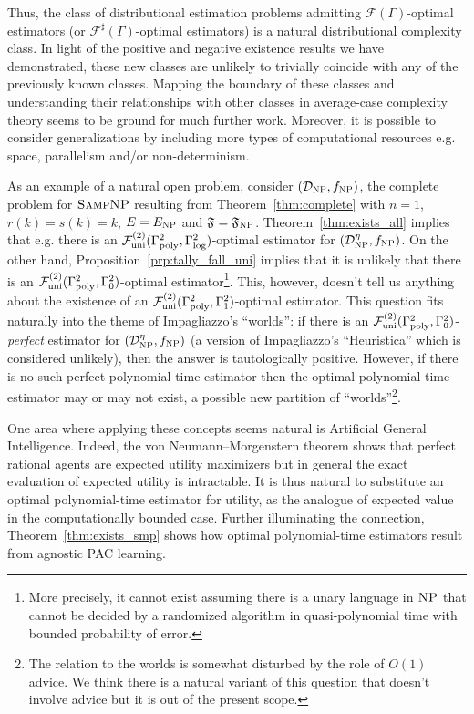 \documentclass[11pt]{article}
\numberwithin{equation}{section}
\theoremstyle{definition}
\theoremstyle{plain}
\newcommand{\Dist}{\mathcal{D}}
\newcommand{\Fall}{\mathcal{F}}
\newcommand{\EG}{\Fall(\Gamma)}
\newcommand{\ESG}{\Fall^\sharp(\Gamma)}
\newcommand{\GammaPoly}{\Gamma_{\textnormal{poly}}}
\newcommand{\GammaLog}{\Gamma_{\textnormal{log}}}
\begin{document}
Thus, the class of distributional estimation problems admitting ${\EG}$-optimal estimators (or ${\ESG}$-optimal estimators) is a natural distributional complexity class. In light of the positive and negative existence results we have demonstrated, these new classes are unlikely to trivially coincide with any of the previously known classes. Mapping the boundary of these classes and understanding their relationships with other classes in average-case complexity theory seems to be ground for much further work. Moreover, it is possible to consider generalizations by including more types of computational resources e.g. space, parallelism and/or non-determinism.

As an example of a natural open problem, consider ${(\Dist_{\textsc{NP}}, f_{\textsc{NP}})}$, the complete problem for ${\textsc{SampNP}}$ resulting from Theorem~\ref{thm:complete} with ${n=1}$, ${r(k)=s(k)=k}$, ${E=E_{\textsc{NP}}}$ and ${\mathfrak{F}=\mathfrak{F}_{\textsc{NP}}}$. Theorem~\ref{thm:exists_all} implies that e.g. there is an ${\mathcal{F}_{\text{uni}}^{(2)}(\GammaPoly^2,\GammaLog^2)}$-optimal estimator for ${(\Dist_{\textsc{NP}}^\eta, f_{\textsc{NP}})}$. On the other hand, Proposition~\ref{prp:tally_fall_uni} implies that it is unlikely that there is an ${\mathcal{F}_{\text{uni}}^{(2)}(\GammaPoly^2,\Gamma_0^2)}$-optimal estimator\footnote{More precisely, it cannot exist assuming there is a unary language in ${\textsc{NP}}$ that cannot be decided by a randomized algorithm in quasi-polynomial time with bounded probability of error.}. This, however, doesn't tell us anything about the existence of an ${\mathcal{F}_{\text{uni}}^{(2)}(\GammaPoly^2,\Gamma_1^2)}$-optimal estimator. This question fits naturally into the theme of Impagliazzo's \enquote{worlds}\cite{Impagliazzo_1995}: if there is an ${\mathcal{F}_{\text{uni}}^{(2)}(\GammaPoly^2,\Gamma_0^2)}$-\emph{perfect} estimator for ${(\Dist_{\textsc{NP}}^\eta, f_{\textsc{NP}})}$ (a version of Impagliazzo's \enquote{Heuristica} which is considered unlikely), then the answer is tautologically positive. However, if there is no such perfect polynomial-time estimator then the optimal polynomial-time estimator may or may not exist, a possible new partition of \enquote{worlds}\footnote{The relation to the worlds is somewhat disturbed by the role of $O(1)$ advice. We think there is a natural variant of this question that doesn't involve advice but it is out of the present scope.}.

One area where applying these concepts seems natural is Artificial General Intelligence. Indeed, the von Neumann–Morgenstern theorem shows that perfect rational agents are expected utility maximizers but in general the exact evaluation of expected utility is intractable. It is thus natural to substitute an optimal polynomial-time estimator for utility, as the analogue of expected value in the computationally bounded case. Further illuminating the connection, Theorem~\ref{thm:exists_smp} shows how optimal polynomial-time estimators result from agnostic PAC learning.
\end{document}
